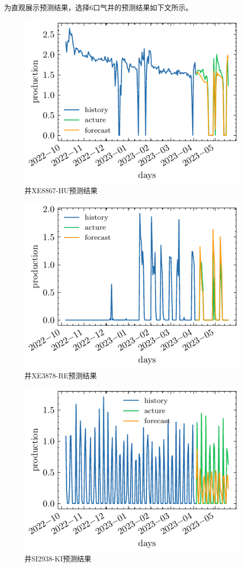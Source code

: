 为直观展示预测结果，选择6口气井的预测结果如下文所示。
\begin{figure}[H]
    \centering
    \includegraphics[width=.9\linewidth]{figure/forecast_SN0018-03.pdf}
    \caption{井XE8867-HU预测结果}
\end{figure}
\begin{figure}[H]
    \centering
    \includegraphics[width=.9\linewidth]{figure/forecast_SN0037-01.pdf}
    \caption{井XE3878-RE预测结果}
\end{figure}
\begin{figure}[H]
    \centering
    \includegraphics[width=.9\linewidth]{figure/forecast_SN0049-08.pdf}
    \caption{井SI2938-KI预测结果}
\end{figure}
